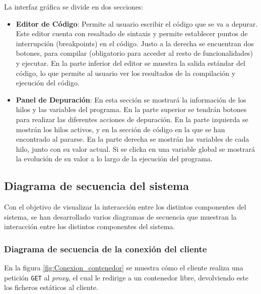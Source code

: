   \begin{figure}[H]
      {}
  \end{figure}

La interfaz gráfica se divide en dos secciones:
\begin{itemize}
    \item \textbf{Editor de Código}: Permite al usuario escribir el código que se va a \gls{depurar}. Este editor cuenta con resaltado de sintaxis y permite establecer puntos de interrupción (\glspl{breakpoint}) en el código. Justo a la derecha se encuentran dos botones, para compilar (obligatorio para acceder al resto de funcionalidades) y ejecutar. En la parte inferior del editor se muestra la salida estándar del código, lo que permite al usuario ver los resultados de la \gls{compilación} y ejecución del código.
    \item \textbf{Panel de Depuración}: En esta sección se mostrará la información de los \glspl{hilo} y las variables del programa. En la parte superior se tendrán botones para realizar las diferentes acciones de depuración. En la parte izquierda se mostrán los \glspl{hilo} activos, y en la sección de código en la que se han encontrado al pararse. En la parte derecha se mostrán las variables de cada \gls{hilo}, junto con su valor actual. Si se clicka en una variable global se mostrará la evolución de su valor a lo largo de la ejecución del programa.  
\end{itemize}

\subsection{Diagrama de secuencia del sistema} \label{sec:diagrama-secuencia}
Con el objetivo de visualizar la interacción entre los distintos componentes del sistema, se han desarrollado varios diagramas de secuencia que muestran la interacción entre los distintos componentes del sistema.

\subsubsection{Diagrama de secuencia de la conexión del cliente} \label{subsec:diagrama-secuencia-conexion}

En la figura \ref{fig:Conexion_contenedor} se muestra cómo el cliente realiza una petición \texttt{GET} al \textit{\gls{proxy}}, el cual le redirige a un \gls{contenedor} libre, devolviendo este los ficheros estáticos al cliente.

